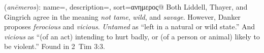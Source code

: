 \item[Vicious,]

(\textit{anēmeros}):
{
    name=,
    description={},
    sort=ανημερος@
}
Both Liddell, Thayer, and Gingrich agree in the meaning \emph{not tame}, \emph{wild}, and \emph{savage}. However, Danker proposes \emph{ferocious} and \emph{vicious}. \emph{Untamed} as ``left in a natural or wild state.'' And \emph{vicious} as ``(of an act) intending to hurt badly, or (of a person or animal) likely to be violent.''
Found in 2~Tim 3:3.
